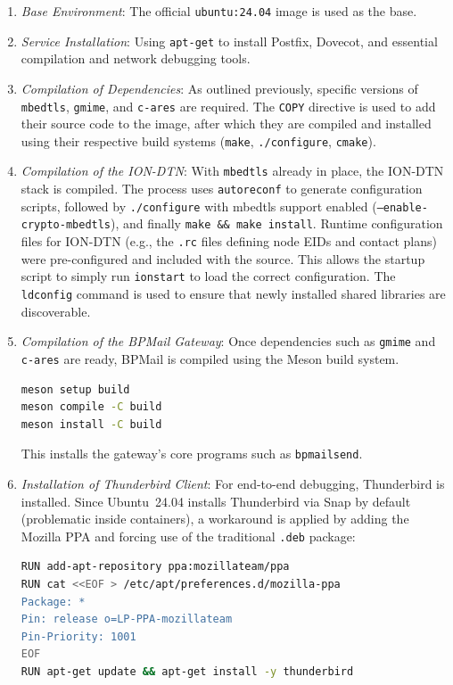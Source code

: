 \begin{enumerate}
    \item \textit{Base Environment}: The official \texttt{ubuntu:24.04} image is used as the base.
    \item \textit{Service Installation}: Using \texttt{apt-get} to install Postfix, Dovecot, and essential compilation and network debugging tools.
    \item \textit{Compilation of Dependencies}: As outlined previously, specific versions of \texttt{mbedtls}, \texttt{gmime}, and \texttt{c-ares} are required. The \texttt{COPY} directive is used to add their source code to the image, after which they are compiled and installed using their respective build systems (\texttt{make}, \texttt{./configure}, \texttt{cmake}).
    \item \textit{Compilation of the ION-DTN}: With \texttt{mbedtls} already in place, the ION-DTN stack is compiled. The process uses \texttt{autoreconf} to generate configuration scripts, followed by \texttt{./configure} with mbedtls support enabled (\texttt{--enable-crypto-mbedtls}), and finally \texttt{make \&\& make install}. Runtime configuration files for ION-DTN (e.g., the \texttt{.rc} files defining node EIDs and contact plans) were pre-configured and included with the source. This allows the startup script to simply run \texttt{ionstart} to load the correct configuration. The \texttt{ldconfig} command is used to ensure that newly installed shared libraries are discoverable.
    \item \textit{Compilation of the BPMail Gateway}: Once dependencies such as \texttt{gmime} and \texttt{c-ares} are ready, BPMail is compiled using the Meson build system.
    
    \begin{lstlisting}[language=bash,caption={Meson Build \& Install Stage}]
meson setup build
meson compile -C build
meson install -C build
    \end{lstlisting}

  This installs the gateway's core programs such as \texttt{bpmailsend}.
  \item \textit{Installation of Thunderbird Client}: For end-to-end debugging, Thunderbird is installed. Since Ubuntu~24.04 installs Thunderbird via Snap by default (problematic inside containers), a workaround is applied by adding the Mozilla PPA and forcing use of the traditional \texttt{.deb} package:

  \begin{lstlisting}[language=bash,caption={Install Thunderbird from Mozilla PPA}]
RUN add-apt-repository ppa:mozillateam/ppa
RUN cat <<EOF > /etc/apt/preferences.d/mozilla-ppa
Package: *
Pin: release o=LP-PPA-mozillateam
Pin-Priority: 1001
EOF
RUN apt-get update && apt-get install -y thunderbird
  \end{lstlisting}

\end{enumerate}

